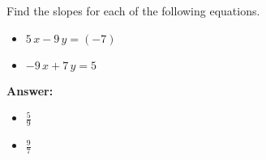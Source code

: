  Find the slopes for each of the following equations. \begin{itemize}\item \( 5 \, x - 9 \, y = \left(-7\right) \)\item \( -9 \, x + 7 \, y = 5 \)\end{itemize}

        \textbf{Answer:} \begin{itemize}\item \( \frac{5}{9} \)\item \( \frac{9}{7} \)\end{itemize}
